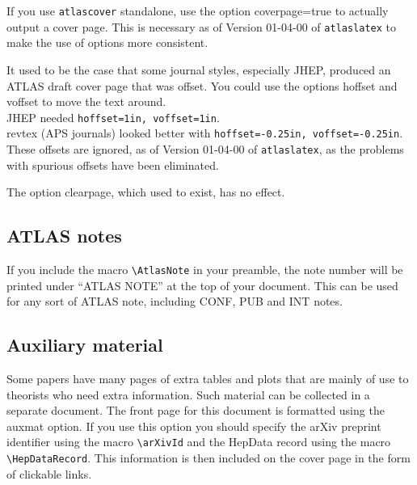 \documentclass[UKenglish]{latex/atlasdoc}
\newcommand{\Macro}[1]{\texttt{\textbackslash #1}\xspace}
\newcommand{\Option}[1]{\textsf{#1}\xspace}
\newcommand{\Package}[1]{\texttt{#1}\xspace}
\begin{document}
If you use \Package{atlascover} standalone, use the option \Option{coverpage=true} to
actually output a cover page. 
This is necessary as of Version 01-04-00 of \Package{atlaslatex} to make the use of options more consistent.

It used to be the case that some journal styles, especially JHEP,
produced an ATLAS draft cover page that was offset.
You could use the options \Option{hoffset} and \Option{voffset} to move the text around.\\
JHEP needed \verb|hoffset=1in, voffset=1in|.\\
revtex (APS journals) looked better with  \verb|hoffset=-0.25in, voffset=-0.25in|.\\
These offsets are ignored, as of Version 01-04-00 of \Package{atlaslatex},
as the problems with spurious offsets have been eliminated.

The option \Option{clearpage}, which used to exist, has no effect.

\subsection{ATLAS notes}
\label{sec:note}

If you include the macro \Macro{AtlasNote} in your preamble,
the note number will be printed under ``ATLAS NOTE'' at the top of your document.
This can be used for any sort of ATLAS note, including CONF, PUB and INT notes.


\subsection{Auxiliary material}
\label{sec:auxmat}

Some papers have many pages of extra tables and plots that are mainly of use to theorists
who need extra information.
Such material can be collected in a separate document.
The front page for this document is formatted using the \Option{auxmat} option.
If you use this option you should specify the arXiv preprint identifier
using the macro \Macro{arXivId} and the HepData record using the macro
\Macro{HepDataRecord}.
This information is then included on the cover page in the form of clickable links.
\end{document}
